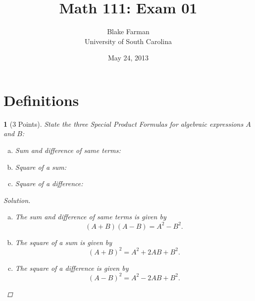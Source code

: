 \documentclass[12pt]{amsart}
\author{Blake Farman\\University of South Carolina}
\title{Math 111: Exam 01}
\date{May 24, 2013}
\begin{document}
\maketitle

\begin{center}
\end{center}

\vspace{0.2in}
\vspace{0.2in}

\theoremstyle{plain}
\newtheorem{thm}{}
\newtheorem{lem}{Lemma}
\theoremstyle{definition}
\newtheorem{defn}{Definition}

\section{Definitions}
\begin{thm}[3 Points]\label{ex1}
  State the three Special Product Formulas for algebraic expressions $A$ and $B$:
  \begin{enumerate}[(a)]
  \item
    Sum and difference of same terms:
  \item
    Square of a sum:
  \item
    Square of a difference:
  \end{enumerate}
  
  \begin{proof}[Solution]
    \begin{enumerate}[(a)]
    \item
      The sum and difference of same terms is given by
      $$(A + B)(A - B) = A^2 - B^2.$$
    \item
      The square of a sum is given by
      $$(A + B)^2 = A^2 + 2AB + B^2.$$
    \item
      The square of a difference is given by
      $$(A - B)^2 = A^2 - 2AB + B^2.$$
    \end{enumerate}
  \end{proof}
\end{thm}
\end{document}
